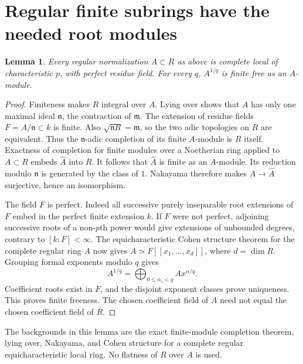 \documentclass[11pt]{article}
\newtheorem{lemma}[theorem]{Lemma}
\begin{document}
\section{Regular finite subrings have the needed root modules}
\begin{lemma}\label{regularbase}
Every regular normalization $A\subset R$ as above is complete local of
characteristic $p$, with perfect residue field. For every $q$,
$A^{1/q}$ is finite free as an $A$-module.
\end{lemma}
\begin{proof}
Finiteness makes $R$ integral over $A$. Lying over shows that $A$ has only
one maximal ideal $\mathfrak n$, the contraction of $\mathfrak m$.
The extension of residue fields $F=A/\mathfrak n\subset k$ is finite.
Also $\sqrt{\mathfrak nR}=\mathfrak m$, so the two adic topologies on $R$
are equivalent. Thus the $\mathfrak n$-adic completion of its finite
$A$-module is $R$ itself. Exactness of completion for finite modules over a
Noetherian ring applied to $A\subset R$ embeds $\widehat A$ into $R$.
It follows that $\widehat A$ is finite as an $A$-module. Its reduction
modulo $\mathfrak n$ is generated by the class of $1$. Nakayama therefore
makes $A\to\widehat A$ surjective, hence an isomorphism.

The field $F$ is perfect. Indeed all successive purely inseparable root
extensions of $F$ embed in the perfect finite extension $k$. If $F$ were
not perfect, adjoining successive roots of a non-$p$th power would give
extensions of unbounded degrees, contrary to $[k:F]<\infty$.
The equicharacteristic Cohen structure theorem for the complete regular
ring $A$ now gives $A\simeq F[[x_1,\ldots,x_d]]$, where $d=\dim R$.
Grouping formal exponents modulo $q$ gives
\[
 A^{1/q}=\bigoplus_{0\le\alpha_i<q} A x^{\alpha/q}.
\]
Coefficient roots exist in $F$, and the disjoint exponent classes prove
uniqueness. This proves finite freeness. The chosen coefficient field of
$A$ need not equal the chosen coefficient field of $R$.
\end{proof}
The backgrounds in this lemma are the exact finite-module completion
theorem, lying over, Nakayama, and Cohen structure for a complete regular
equicharacteristic local ring. No flatness of $R$ over $A$ is used.
\end{document}
